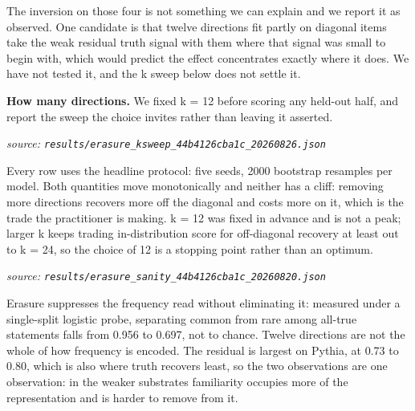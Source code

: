 \documentclass[10pt]{article}
\begin{document}
The inversion on those four is not something we can explain and we report it as observed. One candidate is that twelve directions fit partly on diagonal items take the weak residual truth signal with them where that signal was small to begin with, which would predict the effect concentrates exactly where it does. We have not tested it, and the k sweep below does not settle it.

\textbf{How many directions.} We fixed k = 12 before scoring any held-out half, and report the sweep the choice invites rather than leaving it asserted.

{\footnotesize\raggedright\sloppy \emph{source: \texttt{results/erasure\_ksweep\_44b4126cba1c\_20260826.json}}\par}

\begin{table}[H]
\centering
\small
{}
\end{table}

Every row uses the headline protocol: five seeds, 2000 bootstrap resamples per model. Both quantities move monotonically and neither has a cliff: removing more directions recovers more off the diagonal and costs more on it, which is the trade the practitioner is making. k = 12 was fixed in advance and is not a peak; larger k keeps trading in-distribution score for off-diagonal recovery at least out to k = 24, so the choice of 12 is a stopping point rather than an optimum.

{\footnotesize\raggedright\sloppy \emph{source: \texttt{results/erasure\_sanity\_44b4126cba1c\_20260820.json}}\par}

Erasure suppresses the frequency read without eliminating it: measured under a single-split logistic probe, separating common from rare among all-true statements falls from 0.956 to 0.697, not to chance. Twelve directions are not the whole of how frequency is encoded. The residual is largest on Pythia, at 0.73 to 0.80, which is also where truth recovers least, so the two observations are one observation: in the weaker substrates familiarity occupies more of the representation and is harder to remove from it.
\end{document}
